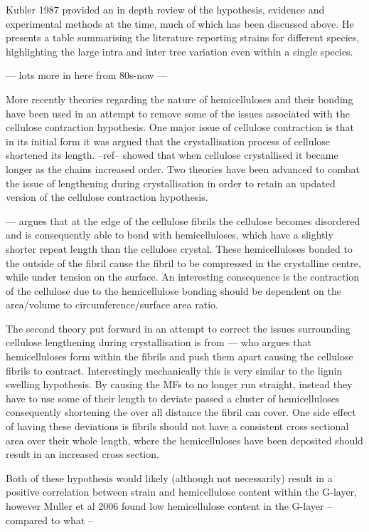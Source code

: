 \documentclass{article}
\begin{document}
Kubler 1987 provided an in depth review of the hypothesis, evidence and
experimental methods at the time, much of which has been discussed above. He
presents a table summarising the literature reporting strains for different
species, highlighting the large intra and inter tree variation even within a
single species.

--- lots more in here from 80s-now ---

More recently theories regarding the nature of hemicelluloses and their bonding
have been used in an attempt to remove some of the issues associated with the
cellulose contraction hypothesis. One major issue of cellulose contraction is
that in its initial form it was argued that the crystallisation process of cellulose
shortened its length. --ref-- showed that when cellulose crystallised it became
longer as the chains increased order. Two theories have been advanced to combat
the issue of lengthening during crystallisation in order to retain an updated
version of the cellulose contraction hypothesis.

--- argues that at the edge of the cellulose fibrils the cellulose becomes
disordered and is consequently able to bond with hemicelluloses, which have a
slightly shorter repeat length than the cellulose crystal. These hemicelluloses
bonded to the outside of the fibril cause the fibril to be compressed in the
crystalline centre, while under tension on the surface. An interesting consequence
is the contraction of the cellulose due to the hemicellulose bonding should be
dependent on the area/volume to circumference/surface area ratio.

The second theory put forward in an attempt to correct the issues surrounding
cellulose lengthening during crystallisation is from --- who argues that
hemicelluloses form within the fibrils and push them apart causing the
cellulose fibrils to contract. Interestingly mechanically this is very similar
to the lignin swelling hypothesis. By causing the MFs to no longer run straight,
instead they have to use some of their length to deviate passed a cluster of
hemicelluloses consequently shortening the over all distance the fibril can
cover. One side effect of having these deviations is fibrils should not have a
consistent cross sectional area over their whole length, where the
hemicelluloses have been deposited should result in an increased cross section.

Both of these hypothesis would likely (although not necessarily) result in a
positive correlation between strain and hemicellulose content within the
G-layer, however Muller et al 2006 found low hemicellulose content in the
G-layer --compared to what --
\end{document}
